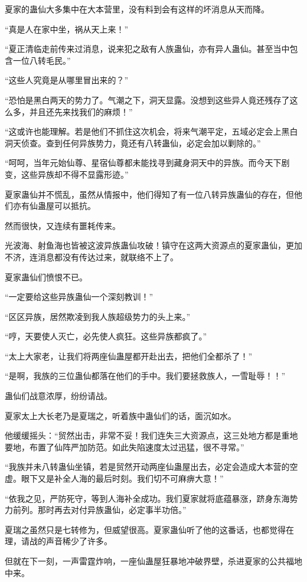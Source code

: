 \begin{this_body}
夏家的蛊仙大多集中在大本营里，没有料到会有这样的坏消息从天而降。

“真是人在家中坐，祸从天上来！”

“夏正清临走前传来过消息，说来犯之敌有人族蛊仙，亦有异人蛊仙。甚至当中包含一位八转毛民。”

“这些人究竟是从哪里冒出来的？”

“恐怕是黑白两天的势力了。气潮之下，洞天显露。没想到这些异人竟还残存了这么多，并且还先来找我们的麻烦！”

“这或许也能理解。若是他们不抓住这次机会，将来气潮平定，五域必定会上黑白洞天侦查。查到任何异族势力，竟还有八转蛊仙，必定会加以剿除的。”

“呵呵，当年元始仙尊、星宿仙尊都未能找寻到藏身洞天中的异族。而今天下剧变，这些异族却不得不显露形迹。”

夏家蛊仙并不慌乱，虽然从情报中，他们得知了有一位八转异族蛊仙的存在，但他们亦有仙蛊屋可以抵抗。

然而很快，又连续有噩耗传来。

光波海、射鱼海也皆被这波异族蛊仙攻破！镇守在这两大资源点的夏家蛊仙，更加不济，连消息都没有传达过来，就联络不上了。

夏家蛊仙们愤恨不已。

“一定要给这些异族蛊仙一个深刻教训！”

“区区异族，居然欺凌到我人族超级势力的头上来。”

“哼，天要使人灭亡，必先使人疯狂。这些异族都疯了。”

“太上大家老，让我们将两座仙蛊屋都开赴出去，把他们全都杀了！”

“是啊，我族的三位蛊仙都落在他们的手中。我们要拯救族人，一雪耻辱！！”

蛊仙们战意浓厚，纷纷请战。

夏家太上大长老乃是夏瑞之，听着族中蛊仙们的话，面沉如水。

他缓缓摇头：“贸然出击，非常不妥！我们连失三大资源点，这三处地方都是重地要地，布置了仙阵严加防范。如此失陷速度太过迅猛，很不寻常。”

“我族并未八转蛊仙坐镇，若是贸然开动两座仙蛊屋出去，必定会造成大本营的空虚。眼下又是补全人海的最后时刻。我们切不可麻痹大意！”

“依我之见，严防死守，等到人海补全成功。我们夏家就将底蕴暴涨，跻身东海势力前列。那时再去对付异族蛊仙，必定事半功倍。”

夏瑞之虽然只是七转修为，但威望很高。夏家蛊仙听了他的这番话，也都觉得在理，请战的声音稀少了许多。

但就在下一刻，一声雷霆炸响，一座仙蛊屋狂暴地冲破界壁，杀进夏家的公共福地中来。


\end{this_body}
